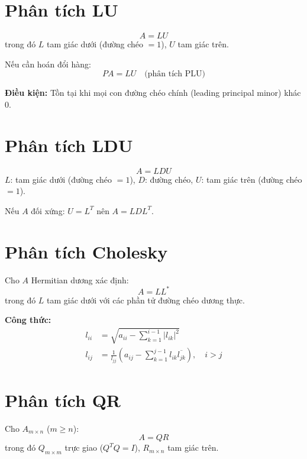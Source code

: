 
\section{Phân tích LU}

\[
A = LU
\]
trong đó $L$ tam giác dưới (đường chéo $= 1$), $U$ tam giác trên.

Nếu cần hoán đổi hàng:
\[
PA = LU \quad \text{(phân tích PLU)}
\]

\textbf{Điều kiện:} Tồn tại khi mọi con đường chéo chính (leading principal minor) khác $0$.

\section{Phân tích LDU}

\[
A = LDU
\]
$L$: tam giác dưới (đường chéo $= 1$), $D$: đường chéo, $U$: tam giác trên (đường chéo $= 1$).

Nếu $A$ đối xứng: $U = L^T$ nên $A = LDL^T$.

\section{Phân tích Cholesky}

Cho $A$ Hermitian dương xác định:
\[
A = LL^*
\]
trong đó $L$ tam giác dưới với các phần tử đường chéo dương thực.

\textbf{Công thức:}
\begin{align}
l_{ii} &= \sqrt{a_{ii} - \sum_{k=1}^{i-1} |l_{ik}|^2} \\
l_{ij} &= \frac{1}{l_{jj}} \left( a_{ij} - \sum_{k=1}^{j-1} l_{ik}\overline{l_{jk}} \right), \quad i > j
\end{align}

\section{Phân tích QR}

Cho $A_{m \times n}$ ($m \ge n$):
\[
A = QR
\]
trong đó $Q_{m \times m}$ trực giao ($Q^TQ = I$), $R_{m \times n}$ tam giác trên.

